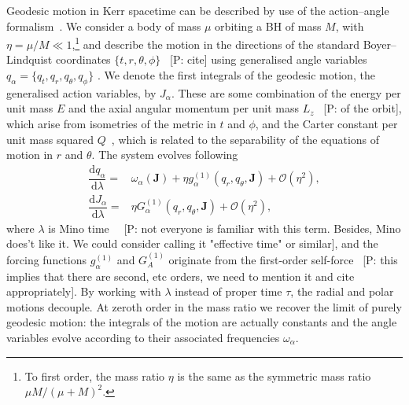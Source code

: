 \documentclass[aps,prd,amsfonts,amssymb,amsmath,nofootinbib,showpacs,superscriptaddress,twocolumn,floatfix]{revtex4-1}
\newcommand{\dd}{\ensuremath{\mathrm{d}}}
\newcommand{\diff}[2]{\ensuremath{\dfrac{\dd {#1}}{\dd {#2}}}}
\newcommand{\order}[1]{\ensuremath{\mathcal{O}({#1})}}
\newcommand{\pcm}[1]{{\color{blue}~\textsf{[P: #1]}}}
\begin{document}
Geodesic motion in Kerr spacetime can be described by use of the action--angle formalism~\cite{Goldstein2002}. %
We consider a body of mass $\mu$ orbiting a BH of mass $M$, with $\eta = \mu/M \ll 1$,\footnote{To first order, the mass ratio $\eta$ is the same as the symmetric mass ratio $\mu M/(\mu+M)^2$.} and describe the motion in the directions of the standard Boyer--Lindquist coordinates $\{t,r,\theta,\phi\}$ \pcm{cite} using generalised angle variables $q_\alpha = \{q_t,q_r,q_\theta,q_\phi\}$ \citep{Hinderer2008}. We denote the first integrals of the geodesic motion, the generalised action variables, by $J_\alpha$. These are some combination of the energy per unit mass $E$ and the axial angular momentum per unit mass $L_z$ \pcm{of the orbit}, which arise from isometries of the metric in $t$ and $\phi$, and the Carter constant per unit mass squared $Q$~\cite{Carter1968}, which is related to the separability of the equations of motion in $r$ and $\theta$. The system evolves following~\cite{Flanagan2012}
\begin{subequations}
\label{eq:Mino-E-o-M}
\begin{align}
\diff{q_\alpha}{\lambda} = {} & \omega_\alpha(\boldsymbol{J}) + \eta g_\alpha^{(1)}(q_r,q_\theta,\boldsymbol{J}) + \order{\eta^2}, \\
\diff{J_\alpha}{\lambda} = {} & \eta G_\alpha^{(1)}(q_r,q_\theta,\boldsymbol{J}) + \order{\eta^2},
\end{align}
\end{subequations}
where $\lambda$ is Mino time~\cite{Mino2003} \pcm{not everyone is familiar with this term. Besides, Mino does't like it. We could consider calling it "effective time" or similar}, and the forcing functions $g_\alpha^{(1)}$ and $G_A^{(1)}$ originate from the first-order self-force \pcm{this implies that there are  second, etc orders, we need to mention it and cite appropriately}. By working with $\lambda$ instead of proper time $\tau$, the radial and polar motions decouple. At zeroth order in the mass ratio we recover the limit of purely geodesic motion: the integrals of the motion are actually constants and the angle variables evolve according to their associated frequencies $\omega_\alpha$.
\end{document}
